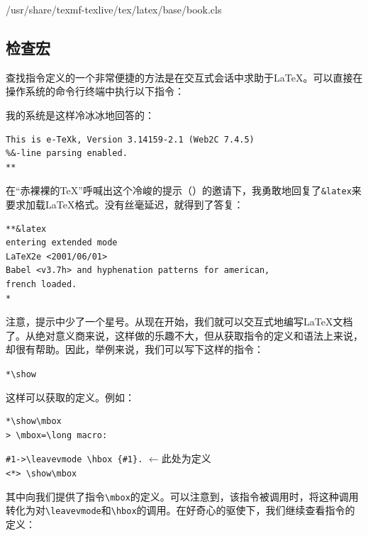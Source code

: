 \begin{dmd}
/usr/share/texmf-texlive/tex/latex/base/book.cls
\end{dmd}

\subsection{检查宏}

查找指令定义的一个非常便捷的方法是在交互式会话中求助于\LaTeX 。可以直接在操作系统的命令行终端中执行以下指令：


我的系统是这样冷冰冰地回答的：

\begin{dmd}
\begin{verbatim}
This is e-TeXk, Version 3.14159-2.1 (Web2C 7.4.5)
%&-line parsing enabled.
**
\end{verbatim}
\end{dmd}

在“赤裸裸的\TeX ”呼喊出这个冷峻的提示（\dm{**}）的邀请下，我勇敢地回复了\verb|&latex|来要求加载\LaTeX 格式。没有丝毫延迟，就得到了答复：

\begin{dmd}
\begin{verbatim}
**&latex
entering extended mode
LaTeX2e <2001/06/01>
Babel <v3.7h> and hyphenation patterns for american,
french loaded.
*
\end{verbatim}
\end{dmd}

注意，提示中少了一个星号。从现在开始，我们就可以交互式地编写\LaTeX 文档了。从绝对意义商来说，这样做的乐趣不大，但从获取指令的定义和语法上来说，却很有帮助。因此，举例来说，我们可以写下这样的指令：

\begin{dmd}
\verb|*\show|
\end{dmd}

这样可以获取的定义。例如：

\begin{dmd}
\begin{verbatim}
*\show\mbox
> \mbox=\long macro:
\end{verbatim}
\verb|#1->\leavevmode \hbox {#1}.| \quad $\leftarrow$\textsf{此处为定义}\\
\verb+<*> \show\mbox+
\end{dmd}

其中向我们提供了指令\verb|\mbox|的定义。可以注意到，该指令被调用时，将这种调用转化为对\verb|\leavevmode|和\verb|\hbox|的调用。在好奇心的驱使下，我们继续查看指令的定义：

